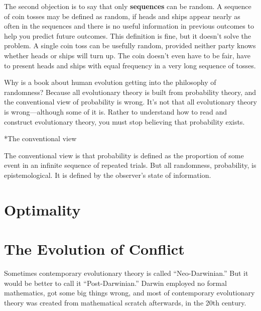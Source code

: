 \documentclass[10pt,reqno]{amsbook}
\makeatletter
\newcommand{\bemph}[1]{{\textbf{\textcolor{bemphcol}{#1}}}}
\renewcommand\section{\@startsection{section}{1}
\z@{.7\linespacing\@plus\linespacing}{.5\linespacing}
{\large\bfseries\itshape}}
\numberwithin{equation}{chapter}
\makeatother
\begin{document}
The second objection is to say that only \bemph{sequences} can be random. A sequence of coin tosses may be defined as random, if heads and ships appear nearly as often in the sequences and there is no useful information in previous outcomes to help you predict future outcomes. This definition is fine, but it doesn't solve the problem. A single coin toss can be usefully random, provided neither party knows whether heads or ships will turn up. The coin doesn't even have to be fair, have to present heads and ships with equal frequency in a very long sequence of tosses.

Why is a book about human evolution getting into the philosophy of randomness? Because all evolutionary theory is built from probability theory, and the conventional view of probability is wrong. It's not that all evolutionary theory is wrong---although some of it is. Rather to understand how to read and construct evolutionary theory, you must stop believing that probability exists.

\section*{The conventional view}

The conventional view is that probability is defined as the proportion of some event in an infinite sequence of repeated trials. But all randomness, probability, is epistemological. It is defined by the observer's state of information. 



\def \chapterElement {O}
\chapter{Optimality}

\lipsum[15-17]


\def \chapterElement {H}
\chapter{The Evolution of Conflict}



Sometimes contemporary evolutionary theory is called ``Neo-Darwinian.'' But it would be better to call it ``Post-Darwinian.'' Darwin employed no formal mathematics, got some big things wrong, and most of contemporary evolutionary theory was created from mathematical scratch afterwards, in the 20th century. 
\end{document}
